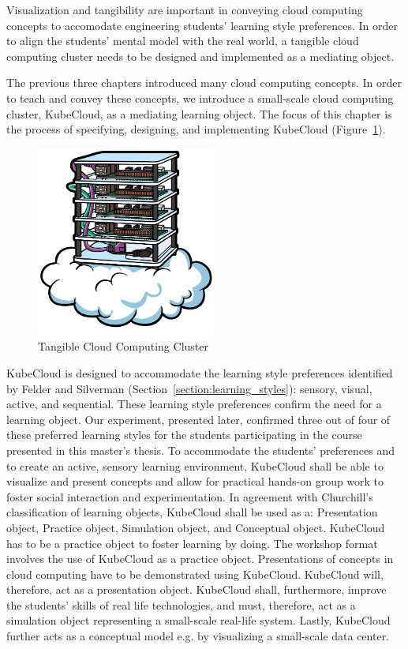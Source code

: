 

\begin{theorem}
    Visualization and tangibility are important in conveying cloud computing concepts to accomodate engineering students' learning style preferences. In order to align the students' mental model with the real world, a tangible cloud computing cluster needs to be designed and implemented as a mediating object.
\end{theorem}

\noindent
The previous three chapters introduced many cloud computing concepts. In order to teach and convey these concepts, we introduce a small-scale cloud computing cluster, KubeCloud, as a mediating learning object. The focus of this chapter is the process of specifying, designing, and implementing KubeCloud (Figure~\ref{fig:raspberry_pi_cluster}).

\begin{figure}[H]
    \centering
    \includegraphics[width=6cm]{figures/raspberry_pi_cluster}
    \caption{Tangible Cloud Computing Cluster}
    \label{fig:raspberry_pi_cluster}
\end{figure}

\noindent
KubeCloud is designed to accommodate the learning style preferences identified by Felder and Silverman (Section~\ref{section:learning_styles}): sensory, visual, active, and sequential. These learning style preferences confirm the need for a learning object. Our experiment, presented later, confirmed three out of four of these preferred learning styles for the students participating in the course presented in this master's thesis. To accommodate the students' preferences and to create an active, sensory learning environment, KubeCloud shall be able to visualize and present concepts and allow for practical hands-on group work to foster social interaction and experimentation. In agreement with Churchill's classification of learning objects, KubeCloud shall be used as a: Presentation object, Practice object, Simulation object, and Conceptual object.
KubeCloud has to be a practice object to foster learning by doing. The workshop format involves the use of KubeCloud as a practice object. Presentations of concepts in cloud computing have to be demonstrated using KubeCloud. KubeCloud will, therefore, act as a presentation object. KubeCloud shall, furthermore, improve the students' skills of real life technologies, and must, therefore, act as a simulation object representing a small-scale real-life system. Lastly, KubeCloud further acts as a conceptual model e.g. by visualizing a small-scale data center.  